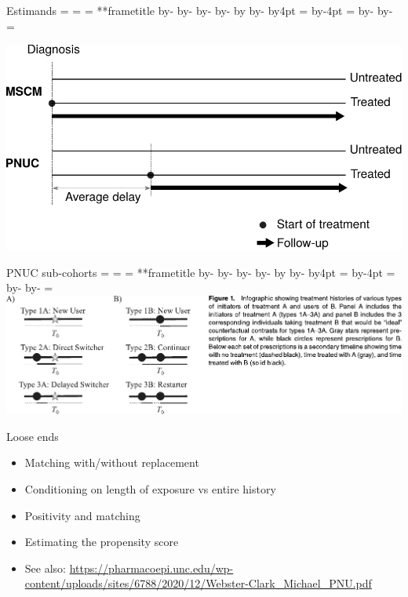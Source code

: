 \documentclass[aspectratio=169,12pt]{beamer} %
\makeatletter
\newif\ifsidebartheme
\newcommand*{\calculatespace}{%
    \contentheight=\paperheight%
    \ifx\beamer@frametitle\@empty%
        \setbox\@tempboxa=\box\voidb@x%
      \else%
        \setbox\@tempboxa=\vbox{%
          \vbox{}%
          {\parskip0pt\usebeamertemplate***{frametitle}}%
        }%
        \ifsidebartheme%
          \advance\contentheight by-1em%
        \fi%
      \fi%
    \advance\contentheight by-\ht\@tempboxa%
    \advance\contentheight by-\dp\@tempboxa%
    \advance\contentheight by-\beamer@frametopskip%
    \ifbeamer@plainframe%
    \contentbottom=0pt%
    \else%
    \advance\contentheight by-\headheight%
    \advance\contentheight by\headdp%
    \advance\contentheight by-\footheight%
    \advance\contentheight by4pt%
    \contentbottom=\footheight%
    \advance\contentbottom by-4pt%
    \fi%
    \contentwidth=\paperwidth%
    \ifbeamer@plainframe%
    \contentleft=0pt%
    \else%
    \advance\contentwidth by-\beamer@rightsidebar%
    \advance\contentwidth by-\beamer@leftsidebar\relax%
    \contentleft=\beamer@leftsidebar%
    \fi%
}
\makeatother
\begin{document}
\begin{frame}{Estimands}
    \calculatespace%
    \begin{center}
	\includegraphics[height=0.95\contentheight]{ref/estimands.pdf}
    \end{center}
\end{frame}

\begin{frame}{PNUC sub-cohorts}
    \calculatespace%
	\includegraphics[width=0.85\contentwidth]{ref/webster-fig1.pdf}
\end{frame}

\begin{frame}{Loose ends}
    \begin{itemize}
	\item Matching with/without replacement
	\item Conditioning on length of exposure vs entire history
	\item Positivity and matching
	\item Estimating the propensity score
	\item See also: \url{https://pharmacoepi.unc.edu/wp-content/uploads/sites/6788/2020/12/Webster-Clark_Michael_PNU.pdf}
    \end{itemize}
\end{frame}

\end{document}
